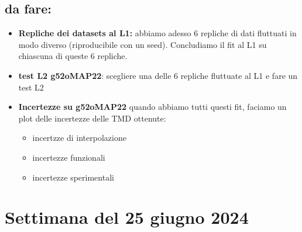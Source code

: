 \documentclass{article}
\begin{document}
\subsection{da fare:}
\begin{itemize}
    

\item \textbf{Repliche dei datasets al L1:} abbiamo adesso 6 repliche di dati fluttuati in modo diverso (riproducibile con un seed). Concludiamo il fit al L1 su chiascuna di queste 6 repliche.

\item \textbf{test L2 g52oMAP22}: scegliere una delle 6 repliche fluttuate al L1 e fare un test L2

\item \textbf{Incertezze su g52oMAP22} quando abbiamo tutti questi fit, faciamo un plot delle incertezze delle TMD ottenute:
\begin{itemize}
    \item incertzze di interpolazione
    \item incertezze funzionali
    \item incertezze sperimentali
\end{itemize}
\end{itemize}
\section{Settimana del 25 giugno 2024}
\end{document}
